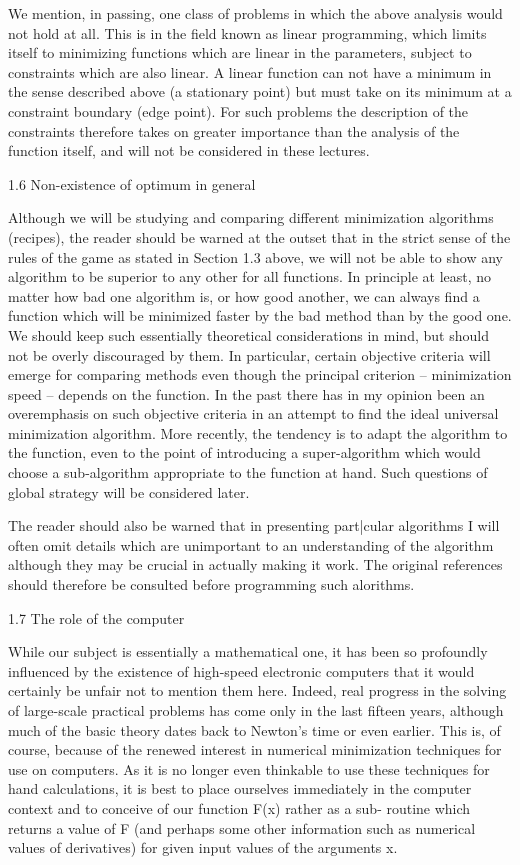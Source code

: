      We mention, in passing, one class of problems in which the above
analysis would not hold at all.  This is in the field known as linear
programming, which limits itself to minimizing functions which are linear
in the parameters, subject to constraints which are also linear.  A
linear function can not have a minimum in the sense described above (a
stationary point) but must take on its minimum at a constraint boundary
(edge point).  For such problems the description of the constraints therefore
takes on greater importance than the analysis of the function
itself, and will not be considered in these lectures.
 
 
1.6  Non-existence of optimum in general
 
     Although we will be studying and comparing
different minimization algorithms (recipes), the reader should be warned
at the outset that in the strict sense of the rules of the game as stated
in Section 1.3 above, we will not be able to show any algorithm to be
superior to any other for all functions.  In principle at least, no
matter how bad one algorithm is, or how good another, we can always find
a function which will be minimized faster by the bad method than by the
good one.  We should keep such essentially theoretical considerations in
mind, but should not be overly discouraged by them.  In particular,
certain objective criteria will emerge for comparing methods even though
the principal criterion -- minimization speed -- depends on the function.
In the past there has in my opinion been an overemphasis on such objective
criteria in an attempt to find the ideal universal minimization
algorithm.  More recently, the tendency is to adapt the algorithm to
the function, even to the point of introducing a super-algorithm which would
choose a sub-algorithm appropriate to the function at hand.  Such questions
of global strategy will be considered later.
 
     The reader should also be warned that in presenting part|cular
algorithms I will often omit details which are unimportant to an
understanding of the algorithm although they may be crucial in actually
making it work.  The original references should therefore be consulted
before programming such alorithms.

 
1.7  The role of the computer
 
     While our subject is essentially a mathematical one, it has been so
profoundly influenced by the existence of high-speed electronic computers
that it would certainly be unfair  not to mention them here.  Indeed,
real progress in the solving of large-scale practical problems has come
only in the last fifteen years, although much of the basic theory dates
back to Newton's time or even earlier.  This is, of course, because of
the renewed interest in numerical minimization techniques for use on
computers.  As it is no longer even thinkable to use these techniques
for hand calculations, it is best to place ourselves immediately in the
computer context and to conceive of our function F(x) rather as a sub-
routine which returns a value of F (and perhaps some other information
such as numerical values of derivatives) for given input values of the
arguments x.
 
